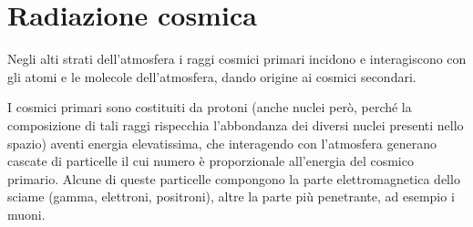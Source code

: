 \section{Radiazione cosmica}

Negli alti strati dell'atmosfera i raggi cosmici primari incidono e interagiscono con gli atomi e le molecole dell'atmosfera, dando origine ai cosmici secondari.

I cosmici primari sono costituiti da protoni (anche nuclei però, perché la composizione di tali raggi rispecchia l'abbondanza dei diversi nuclei presenti nello spazio) aventi energia elevatissima, che interagendo con l'atmosfera generano cascate di particelle il cui numero è proporzionale all'energia del cosmico primario. Alcune di queste particelle compongono la parte elettromagnetica dello sciame (gamma, elettroni, positroni), altre la parte più penetrante, ad esempio i muoni.

